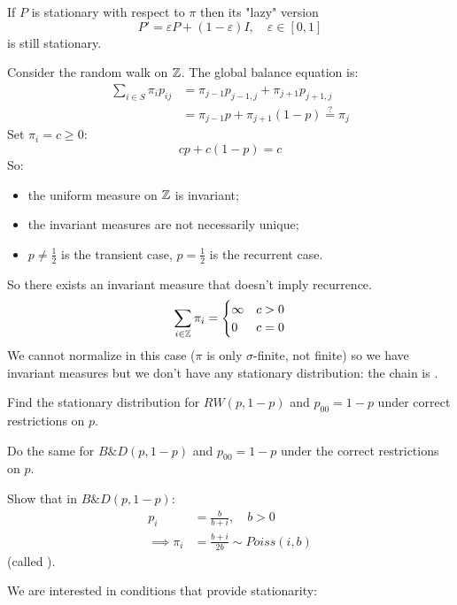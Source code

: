 \documentclass{article}
\begin{document}
\begin{example}
    If $P$ is stationary with respect to $\pi$ then its "lazy" version \[P'=\varepsilon P+(1-\varepsilon)I,\quad\varepsilon\in[0,1]\]is still stationary.
\end{example}
\begin{example}
    Consider the random walk on $\mathbb{Z}$. The global balance equation is:
    \begin{align*}
        \sum_{i \in S} \pi_i p_{ij}&=\pi_{j-1}p_{j-1,j}+\pi_{j+1}p_{j+1,j}\\
        &=\pi_{j-1}p+\pi_{j+1}(1-p)\stackrel{?}{=}\pi_j
    \end{align*}
    Set $\pi_i=c\geqslant0$:
    \[cp+c(1-p)=c\]
    So:\begin{itemize}
        \item the uniform measure on $\mathbb{Z}$ is invariant;
        \item the invariant measures are not necessarily unique;
        \item $p\neq\frac{1}{2}$ is the transient case, $p=\frac{1}{2}$ is the recurrent case.
    \end{itemize}
    So there exists an invariant measure that doesn't imply recurrence.
    \[
    \sum_{i\in\mathbb{Z}}\pi_i=\begin{cases}
        \infty &c>0\\
        0 &c=0
    \end{cases}
    \]
    We cannot normalize in this case ($\pi$ is only $\sigma$-finite, not finite) so we have invariant measures but we don't have any stationary distribution: the chain is .
\end{example}
\begin{exercise}
    Find the stationary distribution for $RW(p,1-p)$ and $p_{00}=1-p$ under correct restrictions on $p$.
\end{exercise}
\begin{exercise}
    Do the same for $B\&D(p,1-p)$ and $p_{00}=1-p$ under the correct restrictions on $p$.
\end{exercise}
\begin{exercise}
    Show that in $B\&D(p,1-p)$:
    \begin{align*}
        p_i&=\frac{b}{b+i},\quad b>0\\
        \implies\pi_i&=\frac{b+i}{2b}\sim Poiss(i,b)
    \end{align*}
    (called ).
\end{exercise}
We are interested in conditions that provide stationarity:
\end{document}
